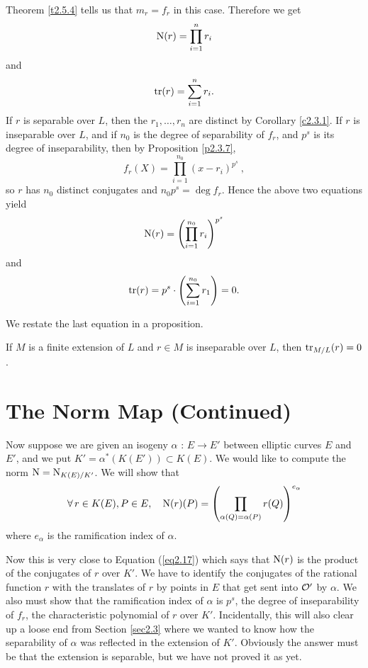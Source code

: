 Theorem \ref{t2.5.4} tells us that $m_{r}=f_{r}$ in this case. Therefore we get
\begin{equation}
\label{eq2.16}
\operatorname{N}(r)=\prod_{i=1}^{n}r_{i}
\end{equation}
and
\begin{equation*}
\operatorname{tr}(r)=\sum_{i=1}^{n}r_{i} .
\end{equation*}
If $r$ is separable over $L$, then the $r_{1}, \ldots, r_{n}$ are distinct by Corollary \ref{c2.3.1}. If $r$ is inseparable over $L$, and if $n_{0}$ is the degree of separability of $f_{r}$, and $p^{s}$ is its degree of inseparability, then by Proposition \ref{p2.3.7},
$$
f_{r}(X)=\prod_{i=1}^{n_{0}}(x-r_{i})^{p^{s}}\ ,
$$
so $r$ has $n_{0}$ distinct conjugates and $n_0 p^s = \deg f_r$. Hence the above two equations yield
\begin{equation}
\label{eq2.17}
\operatorname{N}(r)=\left(\prod_{i=1}^{n_{0}}r_{i}\right)^{p^{s}}
\end{equation}
and
\begin{equation*}
\operatorname{tr}(r)=p^{s} \cdot \left(\sum_{i=1}^{n_{0}}r_{1}\right)=0 .
\end{equation*}



We restate the last equation in a proposition.

\begin{prop}
\label{p2.5.10}
If $M$ is a finite extension of $L$ and $r\in M$ is inseparable over $L$, then $\operatorname{tr}_{M/L}(r)=0$.
\end{prop}

\section{The Norm Map (Continued)}
\label{sec2.6}

Now suppose we are given an isogeny $\alpha$ : $E\rightarrow E'$ between elliptic curves $E$ and $E'$, and we put $K'=\alpha^{*}(K(E'))\subset K(E)$. We would like to compute the norm $\operatorname{N}=\operatorname{N}_{K(E)/K'}$. We will show that
\begin{equation}
\label{eq2.18}
\forall \, r \in K(E), P \in E, \quad \operatorname{N}(r)(P)=\left(\prod_{\alpha(Q)=\alpha(P)}r(Q)\right)^{e_{\alpha}}
\end{equation}
where $e_{\alpha}$ is the ramification index of $\alpha$.

Now this is very close to Equation (\ref{eq2.17}) which says that $\operatorname{N}(r)$ is the product of the conjugates of $r$ over $K'$. We have to identify the conjugates of the rational function $r$ with the translates of $r$ by points in $E$ that get sent into $\mathcal{O}'$ by $\alpha$. We also must show that the ramification index of $\alpha$ is $p^{s}$, the degree of inseparability of $f_{r}$, the characteristic polynomial of $r$ over $K'$.
Incidentally, this will also clear up a loose end from Section \ref{sec2.3} where we wanted to know how the separability of $\alpha$ was reflected in the extension of $K'$. Obviously the answer must be that the extension is separable, but we have not proved it as yet.

